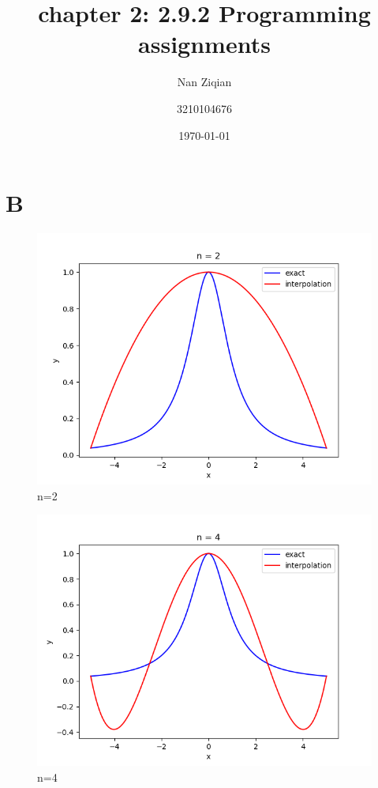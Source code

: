 \documentclass{article}
\title{chapter 2: 2.9.2 Programming assignments}
\author{Nan Ziqian
    \and 3210104676}
\date{\today}
\begin{document}
\maketitle
\section{B}

    
    \begin{figure}[H]
        \centering
        \includegraphics{../code/output/B_n2.png}
        \caption{n=2}
    \end{figure} 

    \begin{figure}[H]
        \centering
        \includegraphics{../code/output/B_n4.png}
        \caption{n=4}
    \end{figure} 
\end{document}
